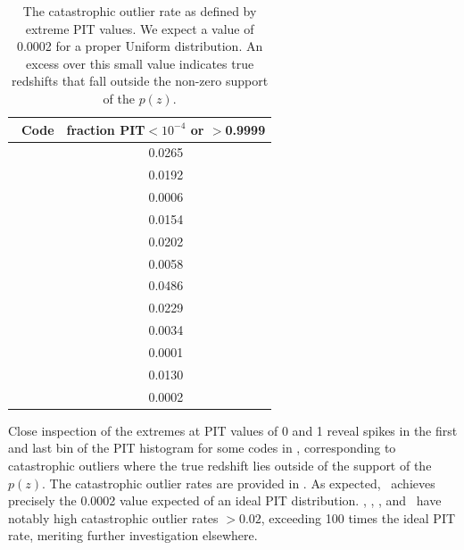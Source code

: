 \begin{table}
	\setlength{\tabcolsep}{2pt}
	\centering
	\caption[The catastrophic outlier rate for the codes of ]
		{The catastrophic outlier rate as defined by extreme PIT values.
		We expect a value of 0.0002 for a proper Uniform distribution.
		An excess over this small value indicates true redshifts that fall outside the non-zero support of the $p(z)$.}
	\begin{tabular}{lc}
		\hline
		\hline
		\Pz\ Code & fraction PIT$<10^{-4}$ or $>$0.9999\\
		\hline
		\annz       & 0.0265\\
		\bpz        & 0.0192\\
		\delight    & 0.0006\\
		\eazy       & 0.0154\\
		\flexzboost & 0.0202\\
		\gpz        & 0.0058\\
		\lephare    & 0.0486\\
		\metaphor   & 0.0229\\
		\cmnn       & 0.0034\\
		\skynet     & 0.0001\\
		\tpz        & 0.0130\\
		\hline
		\trainz     & 0.0002\\
	\end{tabular}
\end{table}

Close inspection of the extremes at PIT values of 0 and 1 reveal spikes in the first and last bin of the PIT histogram for some codes in , corresponding to catastrophic outliers where the true redshift lies outside of the support of the $p(z)$.
The catastrophic outlier rates are provided in .
As expected, \trainz\ achieves precisely the 0.0002 value expected of an ideal PIT distribution.
\annz, \flexzboost, \lephare, and \metaphor\ have notably high catastrophic outlier rates $> 0.02$, exceeding 100 times the ideal PIT rate, meriting further investigation elsewhere.

